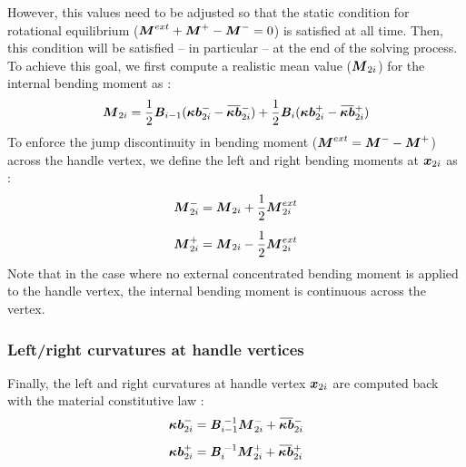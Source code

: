 However, this values need to be adjusted so that the static condition for rotational equilibrium ($\boldsymbol{M}^{ext}  + \boldsymbol{M}^+ - \boldsymbol{M}^- = 0$) is satisfied at all time. Then, this condition will be satisfied -- in particular -- at the end of the solving process. To achieve this goal, we first compute a realistic mean value ($\boldsymbol{M}_{2i}$) for the internal bending moment as :
\begin{equation}
		\vect{M}_{2i} 	=  \frac{1}{2} \mat{B}_{i-1}(\vect{\kappa b}_{2i}^- - \overbar{\vect{\kappa b}}_{2i}^-)
					+  \frac{1}{2} \mat{B}_{i}(\vect{\kappa b}_{2i}^+ - \overbar{\vect{\kappa b}}_{2i}^+)
\end{equation}
To enforce the jump discontinuity in bending moment ($\boldsymbol{M}^{ext} = \boldsymbol{M}^- - \boldsymbol{M}^+$) across the handle vertex, we define the left and right bending moments at $\boldsymbol{x}_{2i}$ as :
\begin{subequations}
	\begin{align}
		\boldsymbol{M}_{2i}^- 	&=  \boldsymbol{M}_{2i} + \frac{1}{2} \boldsymbol{M}_{2i}^{ext} 
		\\[0.5em]
		\boldsymbol{M}_{2i}^+ 	&=  \boldsymbol{M}_{2i} - \frac{1}{2} \boldsymbol{M}_{2i}^{ext} 
	\end{align}
\end{subequations}
Note that in the case where no external concentrated bending moment is applied to the handle vertex, the internal bending moment is continuous across the vertex.

\subsubsection{Left/right curvatures at handle vertices}

Finally, the left and right curvatures at handle vertex $\boldsymbol{x}_{2i}$ are computed back with the material constitutive law :
\begin{subequations}
	\begin{align}
		\vect{\kappa b}_{2i}^-  &=  \mat{B}_{i-1}^{\;-1} \vect{M}_{2i}^- + \overbar{\vect{\kappa b}}_{2i}^- 
		\\[0.5em]
		\vect{\kappa b}_{2i}^+  &=  \mat{B}_{i}^{\;-1} \vect{M}_{2i}^+ + \overbar{\vect{\kappa b}}_{2i}^+ 
	\end{align}
\end{subequations}

